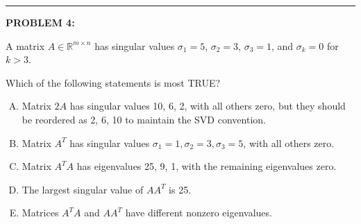 \documentclass[12pt]{amsart}
\newcommand{\divider}{
  \vspace{-1em} %
  \noindent
  \raisebox{-0.15ex}{\textbullet}%
  \hspace{0.5em}%
  \rule[0.5ex]{0.95\textwidth}{1.0pt}%
  \hspace{0.5em}%
  \raisebox{-0.15ex}{\textbullet}%
  \vspace{0em} %
}
\begin{document}
\divider

\newpage

{\bf PROBLEM 4:}

A matrix $A \in \mathbb{R}^{m \times n}$ has singular values $\sigma_1 = 5$, $\sigma_2 = 3$, $\sigma_3 = 1$, and $\sigma_k = 0$ for $k>3$. 

Which of the following statements is most TRUE?

\begin{enumerate}[(A)]
\item Matrix $2A$ has singular values 10, 6, 2, with all others zero, but they should be reordered as 2, 6, 10 to maintain the SVD convention.
\item Matrix $A^T$ has singular values $\sigma_1=1, \sigma_2=3, \sigma_3=5$, with all others zero.
\item Matrix $A^TA$ has eigenvalues 25, 9, 1, with the remaining eigenvalues zero.
\item The largest singular value of $AA^T$ is 25.
\item Matrices $A^TA$ and $AA^T$ have different nonzero eigenvalues.
\end{enumerate}

\end{document}
